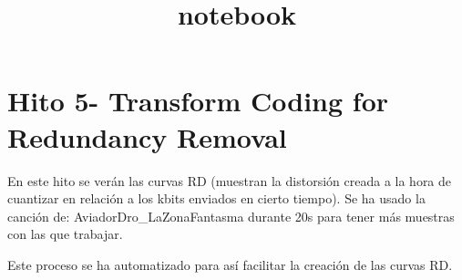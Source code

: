 \documentclass[11pt]{article}
\title{notebook}
\begin{document}
    
    \maketitle
    
    

    
    \section{Hito 5- Transform Coding for Redundancy
Removal}\label{hito-5--transform-coding-for-redundancy-removal}

    En este hito se verán las curvas RD (muestran la distorsión creada a la
hora de cuantizar en relación a los kbits enviados en cierto tiempo). Se
ha usado la canción de: AviadorDro\_LaZonaFantasma durante 20s para
tener más muestras con las que trabajar.

    Este proceso se ha automatizado para así facilitar la creación de las
curvas RD.
\end{document}
